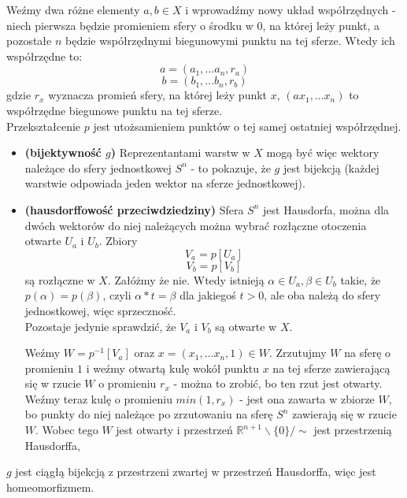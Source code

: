 Weźmy dwa różne elementy $ a, b \in X $ i wprowadźmy nowy układ współrzędnych - niech pierwsza będzie promieniem sfery o środku w $0$, na której leży punkt, a pozostałe $n$ będzie współrzędnymi biegunowymi punktu na tej sferze. Wtedy ich współrzędne to:
$$
a = (a_1, ... a_n, r_a)
$$
$$
b = (b_1, ... b_n, r_b)
$$
gdzie $ r_x $ wyznacza promień sfery, na której leży punkt $ x $, $ (a x_1, ... x_n) $ to współrzędne biegunowe punktu na tej sferze.\\
Przekształcenie $p$ jest utożsamieniem punktów o tej samej ostatniej współrzędnej.
\begin{itemize}
\item \textbf{(bijektywność $g$)} Reprezentantami warstw w $X$ mogą być więc wektory należące do sfery jednostkowej $S^n$ - to pokazuje, że $g$ jest bijekcją (każdej warstwie odpowiada jeden wektor na sferze jednostkowej).
\item \textbf{(hausdorffowość przeciwdziedziny)} Sfera $S^n$ jest Hausdorfa, można dla dwóch wektorów do niej należących można wybrać rozłączne otoczenia otwarte $U_a$ i $U_b$.
Zbiory
$$
V_a = p[U_a]
$$
$$
V_b = p[V_b]
$$
są rozłączne w $X$. Załóżmy że nie. Wtedy istnieją $ \alpha \in U_a, \beta \in U_b $ takie, że $ p(\alpha) = p(\beta) $, czyli $\alpha * t = \beta$ dla jakiegoś $t > 0$, ale oba należą do sfery jednostkowej, więc sprzeczność.\\
Pozostaje jedynie sprawdzić, że $V_a$ i $V_b$ są otwarte w $X$.

Weźmy $ W = p^{-1}[V_a] $ oraz $ x = (x_1, ... x_n, 1) \in W $. Zrzutujmy $W$ na sferę o promieniu $1$ i weźmy otwartą kulę wokół punktu $x$ na tej sferze zawierającą się w rzucie $W$ o promieniu $r_x$ - można to zrobić, bo ten rzut jest otwarty. \\
Weźmy teraz kulę o promieniu $min(1, r_x)$ - jest ona zawarta w zbiorze $W$, bo punkty do niej należące po zrzutowaniu na sferę $S^n$ zawierają się w rzucie $W$. Wobec tego $W$ jest otwarty i przestrzeń  $\mathbb{R}^{n+1} \backslash \{0\} / \sim$  jest przestrzenią Hausdorffa,
\end{itemize}

$g$ jest ciągłą bijekcją z przestrzeni zwartej w przestrzeń Hausdorffa, więc jest homeomorfizmem.
